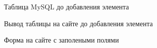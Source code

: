 \begin{figure}[p]
    \caption{Таблица MySQL до добавления элемента}
    \label{fig:mysql_table_before}
\end{figure}

\begin{figure}[p]
    \caption{Вывод таблицы на сайте до добавления элемента}
    \label{fig:site_table_before}
\end{figure}

\begin{figure}[p]
    \caption{Форма на сайте с заполеными полями}
    \label{fig:site_form_add_element_to_table}
\end{figure}

